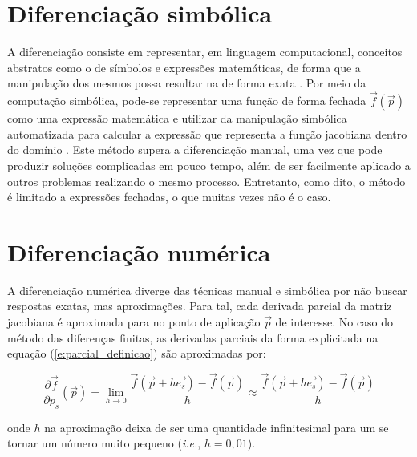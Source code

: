   \section{Diferenciação simbólica}

    A diferenciação \DIFdelbegin {}\DIFdelend \DIFaddbegin {}\DIFaddend consiste em representar, em linguagem computacional, conceitos abstratos como o de símbolos e expressões matemáticas, de forma que a manipulação dos mesmos possa resultar na \DIFdelbegin {}\DIFdelend \DIFaddbegin {}\DIFaddend de forma exata \DIFaddbegin {}\DIFaddend . Por meio da computação simbólica, pode-se representar uma função de forma fechada $\vec{f}(\vec{p})$ como uma expressão matemática e utilizar da manipulação simbólica automatizada para calcular a expressão que representa a função jacobiana dentro do domínio \DIFdelbegin {}\DIFdelend \DIFaddbegin {}\DIFaddend . Este método supera a diferenciação manual, uma vez que pode produzir soluções complicadas em pouco tempo, além de ser facilmente aplicado a outros problemas realizando o mesmo processo. Entretanto, como dito, o método é limitado a expressões fechadas, o que muitas vezes não é o caso.

  \section{Diferenciação numérica} \label{s:diferenciacao_numerica}

    A diferenciação numérica diverge das técnicas manual e simbólica por não buscar respostas exatas, mas aproximações. Para tal, cada derivada parcial da matriz jacobiana é aproximada para no ponto de aplicação $\vec{p}$ de interesse. No caso do método das diferenças finitas, as derivadas parciais da forma explicitada na equação (\ref{e:parcial_definicao}) são aproximadas por:

    \begin{equation} \label{e:parcial_aproximada_diff_finitas}
      \frac{\partial \vec{f}}{\partial p_s}(\vec{p})
      =
      \lim_{h \to 0} \frac{\vec{f}(\vec{p} + h \vec{e_s}) - \vec{f}(\vec{p})}{h}
      \approx
      \frac{\vec{f}(\vec{p} + h \vec{e_s}) - \vec{f}(\vec{p})}{h}
    \end{equation}

    \noindent onde $h$ na aproximação deixa de ser uma quantidade infinitesimal para um se tornar um número muito pequeno (\textit{i.e.}, $h=0,01$).

